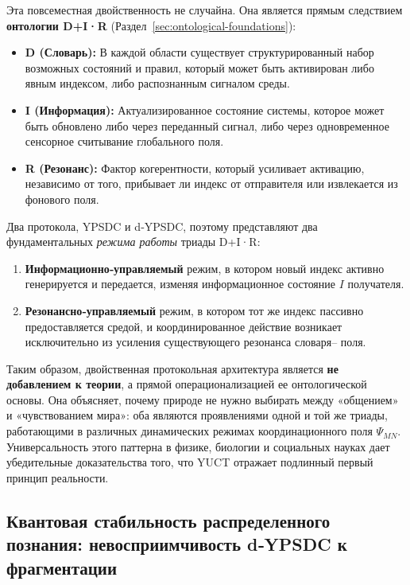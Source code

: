 \documentclass[11pt,a4paper]{article}
\begin{document}
	\medskip
	\noindent
	Эта повсеместная двойственность не случайна. Она является прямым следствием
	\textbf{онтологии D+I·R} (Раздел~\ref{sec:ontological-foundations}):
	\begin{itemize}[leftmargin=*]
		\item \textbf{D (Словарь):} В каждой области существует структурированный
		набор возможных состояний и правил, который может быть активирован либо явным
		индексом, либо распознанным сигналом среды.
		\item \textbf{I (Информация):} Актуализированное состояние системы, которое
		может быть обновлено либо через переданный сигнал, либо через
		одновременное сенсорное считывание глобального поля.
		\item \textbf{R (Резонанс):} Фактор когерентности, который усиливает
		активацию, независимо от того, прибывает ли индекс от отправителя или извлекается
		из фонового поля.
	\end{itemize}
	
	Два протокола, YPSDC и d‑YPSDC, поэтому представляют два фундаментальных
	\emph{режима работы} триады D+I·R:
	\begin{enumerate}[leftmargin=*]
		\item \textbf{Информационно‑управляемый} режим, в котором новый индекс
		активно генерируется и передается, изменяя информационное состояние
		\(I\) получателя.
		\item \textbf{Резонансно‑управляемый} режим, в котором тот же индекс
		пассивно предоставляется средой, и координированное действие
		возникает исключительно из усиления существующего резонанса словаря–
		поля.
	\end{enumerate}
	
	Таким образом, двойственная протокольная архитектура является \textbf{не добавлением к теории},
	а прямой операционализацией ее онтологической основы.
	Она объясняет, почему природе не нужно выбирать между «общением»
	и «чувствованием мира»: оба являются проявлениями одной и той же триады,
	работающими в различных динамических режимах координационного поля
	\(\Psi_{MN}\). Универсальность этого паттерна в физике, биологии
	и социальных науках дает убедительные доказательства того, что YUCT отражает
	подлинный первый принцип реальности.
	
	\subsection{Квантовая стабильность распределенного познания: невосприимчивость d‑YPSDC к фрагментации}
	\label{subsec:quantum-stability-cognition}
	
\end{document}
